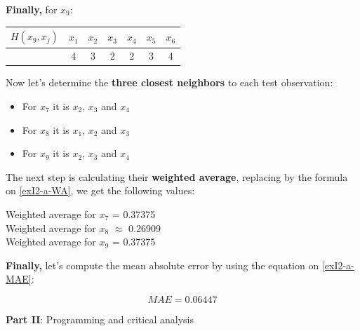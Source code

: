 \documentclass[12pt]{article}
\begin{document}
\begin{enumerate}[leftmargin=\labelsep]
\begin{enumerate}
          \textbf{Finally,} for $x_9$:

          \begin{center}
            \begin{tabular}{c|cccccc}
                \(H(x_9,x_j)\)& \(x_1\) & \(x_2\) & \(x_3\) & \(x_4\) & \(x_5\) &\(x_6\) \\
                \hline
                               & 4 & 3 & 2 & 2 & 3 & 4 \\
            \end{tabular}
          \end{center}

          Now let's determine the \textbf{three closest neighbors} to each test observation:
          
          \begin{itemize}
            \item For $x_7$ it is $x_2$, $x_3$ and $x_4$
            \item For $x_8$ it is $x_1$, $x_2$ and $x_3$
            \item For $x_9$ it is $x_2$, $x_3$ and $x_4$
          \end{itemize}

          The next step is calculating their \textbf{weighted average}, replacing by the
           formula on \eqref{exI2-a-WA}, we get the following values:
            
          \begin{center}
            Weighted average for $x_7$ = 0.37375 \\
            Weighted average for $x_8$ $\approx$ 0.26909 \\
            Weighted average for $x_9$ = 0.37375 \\
          \end{center}
          
          \textbf{Finally,} let's compute the mean absolute error by using the equation 
           on \eqref{exI2-a-MAE}:

           \begin{equation*}
            MAE = 0.06447
           \end{equation*}

          \end{enumerate}
\end{enumerate}

\vskip 0.5cm

\begin{center}
\large{\textbf{Part II}: Programming and critical analysis}\normalsize
\end{center}
\end{document}
